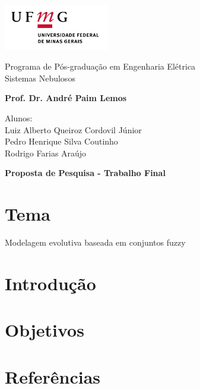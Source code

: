 \documentclass[12pt, a4paper]{article}
\begin{document}
\begin{minipage}[c][3cm][c]{3cm}
\includegraphics[height=2cm]{ufmg.jpg}
\end{minipage}
\begin{minipage}[c][3cm][c]{10cm}
\center
{\sc Programa de Pós-graduação em Engenharia Elétrica}\\
{\sc Sistemas Nebulosos}

\textbf{\footnotesize{Prof. Dr. André Paim Lemos}}
\smallskip


\end{minipage}
\begin{minipage}[c][3cm][c]{5cm}



\end{minipage}
\vspace{.5cm}

\noindent Alunos:\\ 
Luiz Alberto Queiroz Cordovil Júnior\\Pedro Henrique Silva Coutinho\\Rodrigo Farias Araújo\\
\begin{center}
\textbf{Proposta de Pesquisa - Trabalho Final} %
\end{center}
\section{Tema}
Modelagem evolutiva baseada em conjuntos fuzzy
\section{Introdução}

\section{Objetivos}

\section{Referências}
\end{document}

